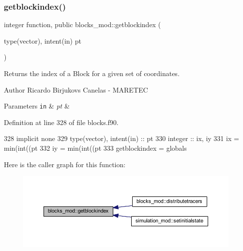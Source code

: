 \mbox{\label{namespaceblocks__mod_a62e8fb0d6b2535b4499c7a4d848c24ba}} 
\subsubsection{\texorpdfstring{getblockindex()}{getblockindex()}}
{\footnotesize\ttfamily integer function, public blocks\+\_\+mod\+::getblockindex (\begin{DoxyParamCaption}\item[{type(vector), intent(in)}]{pt }\end{DoxyParamCaption})}



Returns the index of a Block for a given set of coordinates. 

\begin{DoxyAuthor}{Author}
Ricardo Birjukovs Canelas -\/ M\+A\+R\+E\+T\+EC 
\end{DoxyAuthor}

\begin{DoxyParams}[1]{Parameters}
\mbox{\tt in}  & {\em pt} & \\
\hline
\end{DoxyParams}


Definition at line 328 of file blocks.\+f90.


\begin{DoxyCode}
328     \textcolor{keywordtype}{implicit none}
329     \textcolor{keywordtype}{type}(vector), \textcolor{keywordtype}{intent(in)} :: pt
330     \textcolor{keywordtype}{integer} :: ix, iy
331     ix = min(int((pt%
332     iy = min(int((pt%
333     getblockindex = globals%
\end{DoxyCode}
Here is the caller graph for this function\+:\nopagebreak
\begin{figure}[H]
\begin{center}
\leavevmode
\includegraphics[width=350pt]{namespaceblocks__mod_a62e8fb0d6b2535b4499c7a4d848c24ba_icgraph}
\end{center}
\end{figure}
\mbox{\label{namespaceblocks__mod_a534ca69b17b6f54ee07f995b02feff39}} 
